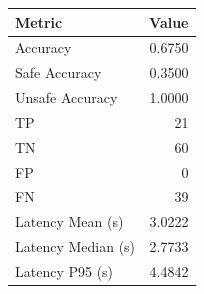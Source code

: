 \begin{table}[ht]
\centering
\begin{tabular}{lr}
\toprule
Metric & Value \\
\midrule
Accuracy & 0.6750 \\
Safe Accuracy & 0.3500 \\
Unsafe Accuracy & 1.0000 \\
TP & 21 \\
TN & 60 \\
FP & 0 \\
FN & 39 \\
Latency Mean (s) & 3.0222 \\
Latency Median (s) & 2.7733 \\
Latency P95 (s) & 4.4842 \\
\bottomrule
\end{tabular}
\end{table}